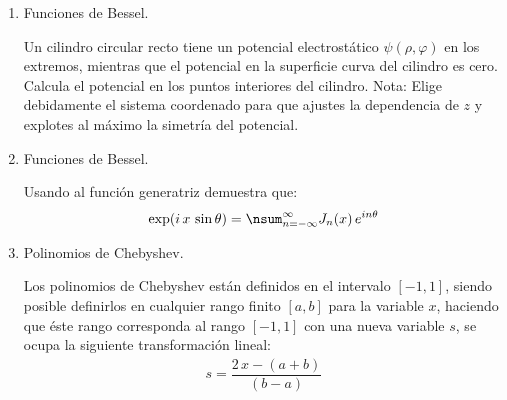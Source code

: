 \begin{enumerate}
\item Funciones de Bessel.
\par
\noindent
Un cilindro circular recto tiene un potencial electrostático $\psi (\rho, \varphi)$ en los extremos, mientras que el potencial en la superficie curva del cilindro es cero. Calcula el potencial en los puntos interiores del cilindro. Nota: Elige debidamente el sistema coordenado para que ajustes la dependencia de $z$ y explotes al máximo la simetría del potencial.
\item Funciones de Bessel.
\par
\noindent
Usando al función generatriz demuestra que:
\begin{align*}
\exp(i \, x \, \sin \theta) = \nsum_{n=-\infty}^{\infty} J_{n}(x) \, e^{i n \theta}
\end{align*}
\item Polinomios de Chebyshev.
\par
\noindent
Los polinomios de Chebyshev están definidos en el intervalo $[- 1, 1]$, siendo posible definirlos en cualquier rango finito $[a, b]$ para la variable $x$, haciendo que éste rango corresponda al rango $[-1, 1]$ con una nueva variable $s$, se ocupa la siguiente transformación lineal:
\begin{align*}
s = \dfrac{2 \, x - (a + b)}{(b - a)}
\end{align*}


\end{enumerate}
